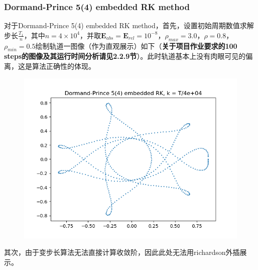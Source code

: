 \documentclass{ctexart}
\begin{document}
\begin{sloppypar}
\subsubsection{Dormand-Prince 5(4) embedded RK method}
对于Dormand-Prince 5(4) embedded RK method，首先，设置初始周期数值求解步长$\frac{T_1}{n}$，其中$n = 4 \times 10^4$，并取$\mathbf{E}_{abs}=\mathbf{E}_{rel}=10^{-8}$，$\rho_{max}=3.0$，$\rho = 0.8$，$\rho_{min} = 0.5$绘制轨道一图像（作为直观展示）如下（\textbf{关于项目作业要求的100 steps的图像及其运行时间分析请见2.2.9节}）。此时轨道基本上没有肉眼可见的偏离，这是算法正确性的体现。
\begin{figure}[H]
\centering
\includegraphics[scale = 0.45]{./report_src/Figure_75.png}
\end{figure}
其次，由于变步长算法无法直接计算收敛阶，因此此处无法用richardson外插展示。


\end{sloppypar}
\end{document}
